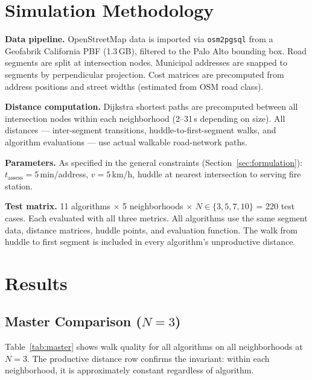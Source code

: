 \documentclass[conference]{IEEEtran}
\begin{document}
\section{Simulation Methodology}
\label{sec:methodology}

\textbf{Data pipeline.} OpenStreetMap data is imported via \texttt{osm2pgsql} from a Geofabrik California PBF (1.3\,GB), filtered to the Palo Alto bounding box. Road segments are split at intersection nodes. Municipal addresses are snapped to segments by perpendicular projection. Cost matrices are precomputed from address positions and street widths (estimated from OSM road class).

\textbf{Distance computation.} Dijkstra shortest paths are precomputed between all intersection nodes within each neighborhood (2--31\,s depending on size). All distances --- inter-segment transitions, huddle-to-first-segment walks, and algorithm evaluations --- use actual walkable road-network paths.

\textbf{Parameters.} As specified in the general constraints (Section~\ref{sec:formulation}): $t_{\text{assess}} = 5$\,min/address, $v = 5$\,km/h, huddle at nearest intersection to serving fire station.

\textbf{Test matrix.} 11 algorithms $\times$ 5 neighborhoods $\times$ $N \in \{3, 5, 7, 10\}$ = 220 test cases. Each evaluated with all three metrics. All algorithms use the same segment data, distance matrices, huddle points, and evaluation function. The walk from huddle to first segment is included in every algorithm's unproductive distance.

\section{Results}
\label{sec:results}

\subsection{Master Comparison ($N = 3$)}

Table~\ref{tab:master} shows walk quality for all algorithms on all neighborhoods at $N = 3$. The productive distance row confirms the invariant: within each neighborhood, it is approximately constant regardless of algorithm.
\end{document}

